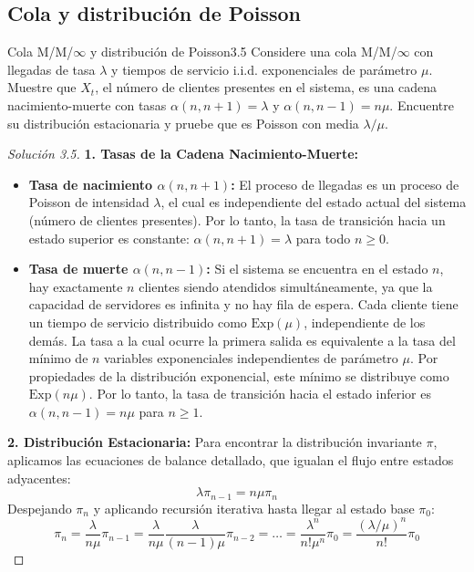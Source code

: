 \documentclass[10pt,a4paper]{article}
\begin{document}
\newpage
\subsection{Cola y distribución de Poisson }

\begin{ejercicio}{Cola M/M/$\infty$ y distribución de Poisson}{3.5}
    Considere una cola M/M/$\infty$ con llegadas de tasa $\lambda$ y tiempos de servicio i.i.d. exponenciales de parámetro $\mu$. Muestre que $X_t$, el número de clientes presentes en el sistema, es una cadena nacimiento-muerte con tasas $\alpha(n, n+1) = \lambda$ y $\alpha(n, n-1) = n\mu$. Encuentre su distribución estacionaria y pruebe que es Poisson con media $\lambda/\mu$.
\end{ejercicio}

\begin{proof}[Solución 3.5]
    \textbf{1. Tasas de la Cadena Nacimiento-Muerte:}
    \begin{itemize}
        \item \textbf{Tasa de nacimiento $\alpha(n, n+1)$:} El proceso de llegadas es un proceso de Poisson de intensidad $\lambda$, el cual es independiente del estado actual del sistema (número de clientes presentes). Por lo tanto, la tasa de transición hacia un estado superior es constante: $\alpha(n, n+1) = \lambda$ para todo $n \ge 0$.
        \item \textbf{Tasa de muerte $\alpha(n, n-1)$:} Si el sistema se encuentra en el estado $n$, hay exactamente $n$ clientes siendo atendidos simultáneamente, ya que la capacidad de servidores es infinita y no hay fila de espera. Cada cliente tiene un tiempo de servicio distribuido como $\text{Exp}(\mu)$, independiente de los demás. La tasa a la cual ocurre la primera salida es equivalente a la tasa del mínimo de $n$ variables exponenciales independientes de parámetro $\mu$. Por propiedades de la distribución exponencial, este mínimo se distribuye como $\text{Exp}(n\mu)$. Por lo tanto, la tasa de transición hacia el estado inferior es $\alpha(n, n-1) = n\mu$ para $n \ge 1$.
    \end{itemize}

    \textbf{2. Distribución Estacionaria:}
    Para encontrar la distribución invariante $\pi$, aplicamos las ecuaciones de balance detallado, que igualan el flujo entre estados adyacentes:
    $$ \lambda \pi_{n-1} = n\mu \pi_n $$
    Despejando $\pi_n$ y aplicando recursión iterativa hasta llegar al estado base $\pi_0$:
    $$ \pi_n = \frac{\lambda}{n\mu} \pi_{n-1} = \frac{\lambda}{n\mu} \frac{\lambda}{(n-1)\mu} \pi_{n-2} = \dots = \frac{\lambda^n}{n! \mu^n} \pi_0 = \frac{(\lambda/\mu)^n}{n!} \pi_0 $$
    

\end{proof}
\end{document}

